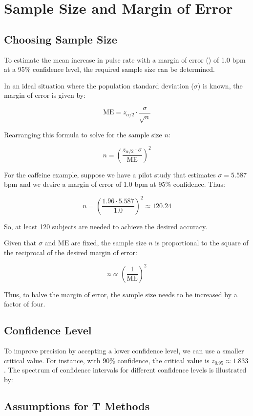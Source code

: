 \documentclass{article}
\begin{document}
\section*{Sample Size and Margin of Error}

\subsection*{Choosing Sample Size}

To estimate the mean increase in pulse rate with a margin of error () of 1.0 bpm at a 95\% confidence level, the required sample size can be determined. 

In an ideal situation where the population standard deviation (\(\sigma\)) is known, the margin of error is given by:

\[
\text{ME} = z_{\alpha/2} \cdot \frac{\sigma}{\sqrt{n}}
\]

Rearranging this formula to solve for the sample size \(n\):

\[
n = \left(\frac{z_{\alpha/2} \cdot \sigma}{\text{ME}}\right)^2
\]

For the caffeine example, suppose we have a pilot study that estimates \(\sigma = 5.587\) bpm and we desire a margin of error of 1.0 bpm at 95\% confidence. Thus:

\[
n = \left(\frac{1.96 \cdot 5.587}{1.0}\right)^2 \approx 120.24
\]

So, at least 120 subjects are needed to achieve the desired accuracy.

Given that \(\sigma\) and \(\text{ME}\) are fixed, the sample size \(n\) is proportional to the square of the reciprocal of the desired margin of error:

\[
n \propto \left(\frac{1}{\text{ME}}\right)^2
\]

Thus, to halve the margin of error, the sample size needs to be increased by a factor of four.

\subsection*{Confidence Level}

To improve precision by accepting a lower confidence level, we can use a smaller critical value. For instance, with 90\% confidence, the critical value is \(z_{0.95} \approx 1.833\). The spectrum of confidence intervals for different confidence levels is illustrated by:


\subsection*{Assumptions for T Methods}
\end{document}
